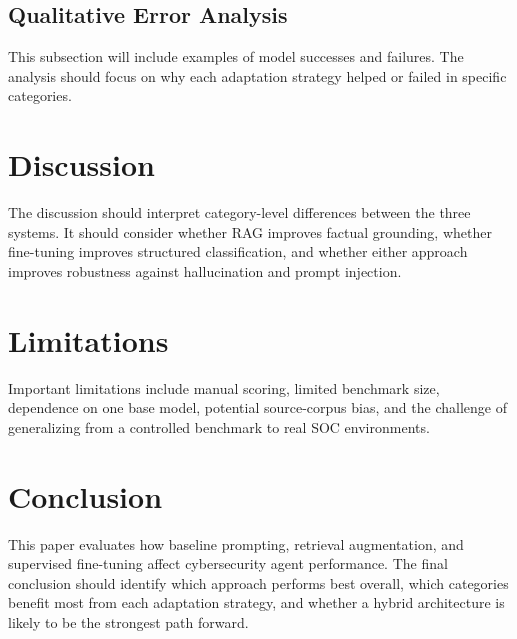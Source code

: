 \documentclass[10pt,conference]{IEEEtran}
\begin{document}
\subsection{Qualitative Error Analysis}

This subsection will include examples of model successes and failures. The analysis should focus on why each adaptation strategy helped or failed in specific categories.

\section{Discussion}

The discussion should interpret category-level differences between the three systems. It should consider whether RAG improves factual grounding, whether fine-tuning improves structured classification, and whether either approach improves robustness against hallucination and prompt injection.

\section{Limitations}

Important limitations include manual scoring, limited benchmark size, dependence on one base model, potential source-corpus bias, and the challenge of generalizing from a controlled benchmark to real SOC environments.

\section{Conclusion}

This paper evaluates how baseline prompting, retrieval augmentation, and supervised fine-tuning affect cybersecurity agent performance. The final conclusion should identify which approach performs best overall, which categories benefit most from each adaptation strategy, and whether a hybrid architecture is likely to be the strongest path forward.



\end{document}
